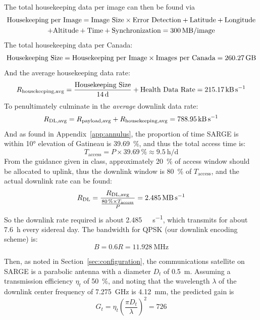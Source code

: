 \documentclass[9pt]{article}
\begin{document}
\noindent The total housekeeping data per image can then be found via
\begin{multline}
  \text{Housekeeping per Image} = \text{Image Size}\times\text{Error Detection}+\text{Latitude}+\text{Longitude}\\+\text{Altitude}+\text{Time}+\text{Synchronization} = \qty{300}{\mega\byte\per image}
\end{multline}
The total housekeeping data per Canada:
\begin{equation}
  \text{Housekeeping Size} = \text{Housekeeping per Image} \times \text{Images per Canada} = \qty{260.27}{\giga\byte}
\end{equation}
And the average housekeeping data rate:
\begin{equation}
  R_\text{housekeeping,avg} = \frac{\text{Housekeeping Size}}{\qty{14}{\day}}+\text{Health Data Rate}=\qty{215.17}{\kilo\byte\per\second}
\end{equation}
To penultimately culminate in the \textit{average} downlink data rate:
\begin{equation}\label{eq:avgdownlinkdatarate}
  R_\text{DL,avg}=R_\text{payload,avg}+R_\text{housekeeping,avg}=\qty{788.95}{\kilo\byte\per\second}
\end{equation}
And as found in Appendix~\ref{app:annulus}, the proportion of time SARGE is within \ang{10} elevation of Gatineau is \qty{39.69}{\percent}, and thus the total access time is:
\begin{equation}\label{eq:totalaccess}
  T_\text{access} = P\times\qty{39.69}{\percent}\approx\qty{9.5}{\hour\per\day}
\end{equation}
From the guidance given in class, approximately \qty{20}{\percent} of access window should be allocated to uplink, thus the downlink window is \qty{80}{\percent} of $T_\text{access}$, and the actual downlink rate can be found:
\begin{equation}
  R_\text{DL} = \frac{R_\text{DL,avg}}{\frac{\qty{80}{\percent}\times T_\text{access}}{P}}=\qty{2.485}{\mega\byte\per\second}
\end{equation}
So the downlink rate required is about \qty{2.485}{\mega\byte\per\second}, which transmits for about \qty{7.6}{\hour} every sidereal day.
The bandwidth for QPSK (our downlink encoding scheme) is:
\begin{equation}
  B=0.6R=\qty{11.928}{\mega\hertz}
  \label{eq:downlinkbw}
\end{equation}

Then, as noted in Section~\ref{sec:configuration}, the communications satellite on SARGE is a parabolic antenna with a diameter $D_t$ of \qty{0.5}{\meter}.
Assuming a transmission efficiency $\eta_t$ of \qty{50}{\percent}, and noting that the wavelength $\lambda$ of the downlink center frequency of \qty{7.275}{\giga\hertz} is \qty{4.12}{\milli\meter}, the predicted gain is
\begin{equation}\label{eq:100}
  G_t=\eta_t\left(\frac{\pi D_t}{\lambda}\right)^2=\num{726}
\end{equation}
\end{document}
